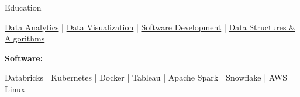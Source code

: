 \documentclass{resume/resume}
\begin{document}
\begin{rSection}{Education}
\begin{adjustwidth}{6em}{0pt}
    \href{https://github.com/UtahTriangle/Laws/blob/main/Proposals/NationalsHelp/figures/distances.pdf}{Data Analytics} |  %
    \href{https://spelkington.github.io/assets/utah_office_update.pdf}{Data Visualization} |  %
    \href{https://github.com/spelkington}{Software Development} |
    \href{https://www.youtube.com/watch?v=lMFQp3wN-cg}{Data Structures \& Algorithms}
    
\end{adjustwidth}


%
%
%
\vspace{-3pt}
{\bf Software:}
\vspace{-1.83em}
\begin{adjustwidth}{6em}{0pt}
    Databricks | 
    Kubernetes | 
    Docker | 
    Tableau | 
    Apache Spark | 
    Snowflake | 
    AWS | 
    Linux


\end{adjustwidth}
\end{rSection}
\end{document}
